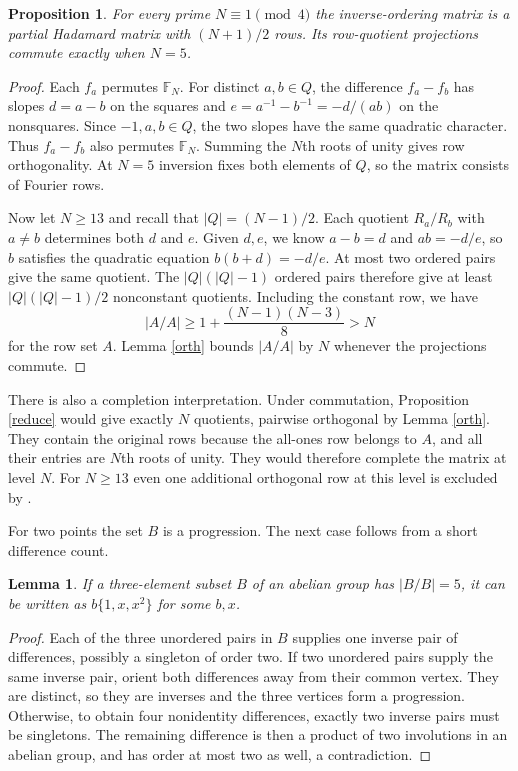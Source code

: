 \documentclass[11pt,a4paper]{article}
\newtheorem{prop}[thm]{Proposition}
\newtheorem{lem}[thm]{Lemma}
\begin{document}
\begin{prop}\label{inverseorder}
For every prime $N\equiv1\pmod4$ the inverse-ordering matrix is a partial Hadamard matrix with $(N+1)/2$ rows. Its row-quotient projections commute exactly when $N=5$.
\end{prop}
\begin{proof}
Each $f_a$ permutes $\mathbb F_N$. For distinct $a,b\in Q$, the difference $f_a-f_b$ has slopes $d=a-b$ on the squares and $e=a^{-1}-b^{-1}=-d/(ab)$ on the nonsquares. Since $-1,a,b\in Q$, the two slopes have the same quadratic character. Thus $f_a-f_b$ also permutes $\mathbb F_N$. Summing the $N$th roots of unity gives row orthogonality. At $N=5$ inversion fixes both elements of $Q$, so the matrix consists of Fourier rows.

Now let $N\geq13$ and recall that $|Q|=(N-1)/2$. Each quotient $R_a/R_b$ with $a\ne b$ determines both $d$ and $e$. Given $d,e$, we know $a-b=d$ and $ab=-d/e$, so $b$ satisfies the quadratic equation $b(b+d)=-d/e$. At most two ordered pairs give the same quotient. The $|Q|(|Q|-1)$ ordered pairs therefore give at least $|Q|(|Q|-1)/2$ nonconstant quotients. Including the constant row, we have
\[
 |A/A|\geq 1+\frac{(N-1)(N-3)}{8}>N
\]
for the row set $A$. Lemma \ref{orth} bounds $|A/A|$ by $N$ whenever the projections commute.
\end{proof}

There is also a completion interpretation. Under commutation, Proposition \ref{reduce} would give exactly $N$ quotients, pairwise orthogonal by Lemma \ref{orth}. They contain the original rows because the all-ones row belongs to $A$, and all their entries are $N$th roots of unity. They would therefore complete the matrix at level $N$. For $N\geq13$ even one additional orthogonal row at this level is excluded by \cite{prime}.

For two points the set $B$ is a progression. The next case follows from a short difference count.

\begin{lem}\label{three}
If a three-element subset $B$ of an abelian group has $|B/B|=5$, it can be written as $b\{1,x,x^2\}$ for some $b,x$.
\end{lem}
\begin{proof}
Each of the three unordered pairs in $B$ supplies one inverse pair of differences, possibly a singleton of order two. If two unordered pairs supply the same inverse pair, orient both differences away from their common vertex. They are distinct, so they are inverses and the three vertices form a progression. Otherwise, to obtain four nonidentity differences, exactly two inverse pairs must be singletons. The remaining difference is then a product of two involutions in an abelian group, and has order at most two as well, a contradiction.
\end{proof}
\end{document}

